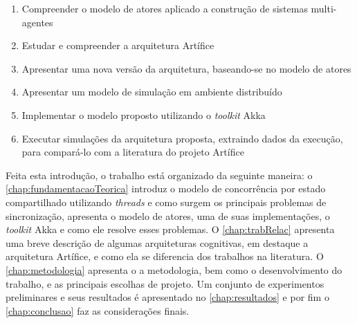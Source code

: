 \begin{enumerate}
    \item Compreender o modelo de atores aplicado a construção de sistemas multi-agentes
    \item Estudar e compreender a arquitetura Artífice 
    \item Apresentar uma nova versão da arquitetura, baseando-se no modelo de atores
    \item Apresentar um modelo de simulação em ambiente distribuído
    \item Implementar o modelo proposto utilizando o \textit{toolkit} Akka
    \item Executar simulações da arquitetura proposta, extraindo dados da execução, para compará-lo com a literatura do projeto Artífice
\end{enumerate}

Feita esta introdução, o trabalho está organizado da seguinte maneira: o \autoref{chap:fundamentacaoTeorica} introduz o modelo de concorrência por estado compartilhado utilizando \textit{threads} e como surgem os principais problemas de sincronização, apresenta o modelo de atores, uma de suas implementações, o \textit{toolkit}  Akka e como ele resolve esses problemas. O \autoref{chap:trabRelac} apresenta uma breve descrição de algumas arquiteturas cognitivas, em destaque a arquitetura Artífice, e como ela se diferencia dos trabalhos na literatura. O \autoref{chap:metodologia} apresenta o a metodologia, bem como o desenvolvimento do trabalho, e as principais escolhas de projeto. Um conjunto de experimentos preliminares e seus resultados é apresentado no \autoref{chap:resultados}  e por fim o  \autoref{chap:conclusao} faz as considerações finais.

